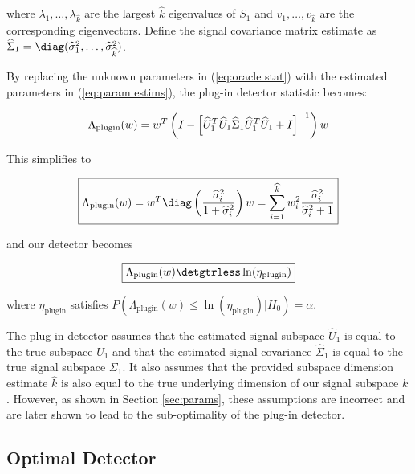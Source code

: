 where $\lambda_1,\dots,\lambda_{\widehat{k}}$ are the largest $\widehat{k}$ eigenvalues of $S_1$ and $v_1,\dots,v_{\widehat{k}}$ are the corresponding eigenvectors. Define the signal covariance matrix estimate as $\widehat{\Sigma}_1=\diag(\widehat{\sigma}_1^2,\dots,\widehat{\sigma}_{\widehat{k}}^2)$.

By replacing the unknown parameters in (\ref{eq:oracle stat}) with the estimated parameters in (\ref{eq:param estims}), the plug-in detector statistic becomes:

\begin{equation*}
\Lambda_{\text{plugin}}(w)= w^T\left(I-\left[\widehat{U}_1^T\widehat{U}_1\widehat{\Sigma}_1\widehat{U}_1^T\widehat{U}_1 + I\right]^{-1}\right)w\\
\end{equation*}

This simplifies to

\begin{equation}\label{eq:plugin stat}
\boxed{\Lambda_{\text{plugin}}(w) = w^T\diag\left(\frac{\widehat{\sigma}^2_i}{1+\widehat{\sigma}^2_i}\right)w=\sum_{i=1}^{\widehat{k}}w_i^2\frac{\widehat{\sigma}_i^2}{\widehat{\sigma}_i^2+1}}
\end{equation}

and our detector becomes

\begin{equation}\label{eq:plugin classifier}
\boxed{\Lambda_{\text{plugin}}(w) \detgtrless \ln(\eta_{\text{plugin}})}
\end{equation}

where $\eta_{\text{plugin}}$ satisfies $P(\Lambda_{\text{plugin}}(w)\leq\ln\left(\eta_{\text{plugin}}\right)|H_0)=\alpha$.

The plug-in detector assumes that the estimated signal subspace $\widehat{U}_1$ is equal to the true subspace $U_1$ and that the estimated signal covariance $\widehat{\Sigma}_1$ is equal to the true signal subspace $\Sigma_1$. It also assumes that the provided subspace dimension estimate $\widehat{k}$ is also equal to the true underlying dimension of our signal subspace $k$. However, as shown in Section \ref{sec:params}, these assumptions are incorrect and are later shown to lead to the sub-optimality of the plug-in detector.

\subsection{Optimal Detector}\label{sec:optimal}

